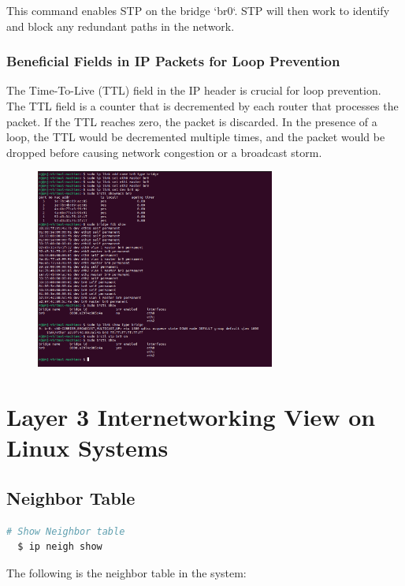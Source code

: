 \documentclass{report}
\begin{document}
This command enables STP on the bridge `br0`. STP will then work to identify and block any redundant paths in the network.
\subsubsection*{Beneficial Fields in IP Packets for Loop Prevention}
The Time-To-Live (TTL) field in the IP header is crucial for loop prevention.
The TTL field is a counter that is decremented by each router that processes the packet.
If the TTL reaches zero, the packet is discarded. In the presence of a loop, the TTL would be decremented multiple times, and the packet would be dropped before causing network congestion or a broadcast storm.

\begin{figure}[h] 
  \centering 
  \includegraphics[width=0.7\textwidth]{16.png} 
\end{figure} 

\newpage
\section*{Layer 3 Internetworking View on Linux Systems}

\subsection*{Neighbor Table}

\begin{lstlisting}[language=bash]
  # Show Neighbor table
  $ ip neigh show
\end{lstlisting}

The following is the neighbor table in the system:
\end{document}
